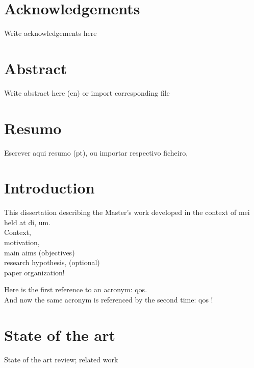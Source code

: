 \documentclass[
  oneside,
  11pt, a4paper,
  footinclude=true,
  headinclude=true,
  cleardoublepage=empty
]{scrbook}
\author{Author of the Thesis}
\date{\myear} %
\begin{document}
	\umfrontcover	
	\umtitlepage
	
	\chapter*{Acknowledgements}
	Write acknowledgements here


	\chapter*{Abstract}
	Write abstract here (en) or import corresponding file
	
	\cleardoublepage
	\chapter*{Resumo}
	Escrever aqui resumo (pt), ou importar respectivo ficheiro,
	
	
	\tableofcontents
	\listoffigures
	\listoftables
	\printglossary[type=\acronymtype]
	\clearpage
	\thispagestyle{empty}

	
	
	\chapter{Introduction}
        This dissertation describing the  Master's work developed in the context of 
        \gls{mei} held at \gls{di}, \gls{um}.\\
		Context,\\ motivation,\\ main aims	(objectives) \\ research hypothesis, (optional) \\ paper organization!
		
		Here is the first reference to an acronym: \gls{qos}.\\
        And now the same acronym is referenced by the second time: 	\gls{qos} !
        
		


	\chapter{State of the art}
		State of the art review; related work
\end{document}
